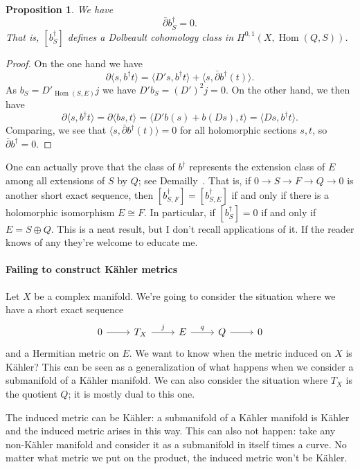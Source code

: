 \documentclass[11pt]{article}
\newtheorem{prop}[theo]{Proposition}
\newtheorem*{proof}{Proof}
\DeclareMathOperator{\Hom}{Hom}
\begin{document}
\begin{prop}
We have
\[
\bar\partial b_S^\dagger = 0.
\]
That is, $[b_S^\dagger]$ defines a Dolbeault cohomology class in $H^{0,1}(X, \Hom(Q,S))$.
\end{prop}

\begin{proof}
On the one hand we have
\[
\partial \langle s, b^\dagger t \rangle
= \langle D's, b^\dagger t \rangle
+ \langle s, \bar\partial b^\dagger (t) \rangle.
\]
As $b_S = D'_{\Hom(S,E)}j$ we have $D'b_S = (D')^2j = 0$. On the other hand, we then have
\[
\partial \langle s, b^\dagger t \rangle
= \partial \langle b s, t \rangle
= \langle D'b (s) + b(Ds), t \rangle
= \langle Ds, b^\dagger t \rangle.
\]
Comparing, we see that $\langle s, \bar\partial b^\dagger (t) \rangle = 0$ for all holomorphic sections $s,t$, so $\bar\partial b^\dagger = 0$.
\end{proof}


One can actually prove that the class of $b^\dagger$ represents the extension class of $E$ among all extensions of $S$ by $Q$; see Demailly~\cite[Proposition~14.9]{demailly-complex}. That is, if $0 \to S \to F \to Q \to 0$ is another short exact sequence, then $[b_{S,F}^\dagger] = [b_{S,E}^\dagger]$ if and only if there is a holomorphic isomorphism $E \cong F$. In particular, if $[b_S^\dagger] = 0$ if and only if $E = S \oplus Q$. This is a neat result, but I don't recall applications of it. If the reader knows of any they're welcome to educate me.



\paragraph{Failing to construct K\"ahler metrics}


Let $X$ be a complex manifold. We're going to consider the situation where we have a short exact sequence
\[
\begin{tikzcd}
0 \arrow[r] & T_X \arrow[r,"j"] & E \arrow[r,"q"] & Q \arrow[r] & 0
\end{tikzcd}
\]
and a Hermitian metric on $E$. We want to know when the metric induced on $X$ is K\"ahler? This can be seen as a generalization of what happens when we consider a submanifold of a K\"ahler manifold. We can also consider the situation where $T_X$ is the quotient $Q$; it is mostly dual to this one.

The induced metric can be K\"ahler: a submanifold of a K\"ahler manifold is K\"ahler and the induced metric arises in this way. This can also not happen: take any non-K\"ahler manifold and consider it as a submanifold in itself times a curve. No matter what metric we put on the product, the induced metric won't be K\"ahler.
\end{document}
